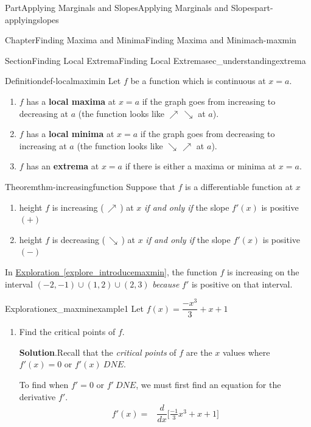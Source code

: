 \documentclass[oneside,10pt,]{tufte-book}
\newcommand{\blocktitlefont}{\relax}
\newcommand{\xreffont}{\relax}
\newcommand{\terminology}[1]{\textbf{#1}}
\numberwithin{equation}{chapter}
\newcommand{\ddx}[1]{ \dfrac{d}{dx} \Big[ #1 \Big]  }
\newcommand{\amp}{&}
\begin{document}
\begin{partptx}{Part}{Applying Marginals and Slopes}{}{Applying Marginals and Slopes}{}{}{part-applyingslopes}
\begin{chapterptx}{Chapter}{Finding Maxima and Minima}{}{Finding Maxima and Minima}{}{}{ch-maxmin}
\begin{sectionptx}{Section}{Finding Local Extrema}{}{Finding Local Extrema}{}{}{sec_understandingextrema}
\begin{definition}{Definition}{}{def-localmaximin}%
Let \(f\) be a function which is continuous at \(x=a\).%
%
\begin{enumerate}
\item{}\(f\) has a \terminology{local maxima} at \(x=a\) if the graph goes from increasing to decreasing at \(a\) (the function looks like \(\nearrow\,\searrow\) at \(a\)).%
\item{}\(f\) has a \terminology{local minima} at \(x=a\) if the graph goes from decreasing to increasing at \(a\) (the function looks like \(\searrow\,\nearrow\) at \(a\)).%
\item{}\(f\) has an \terminology{extrema} at \(x=a\) if there is either a maxima or minima at \(x=a\).%
\end{enumerate}
\end{definition}
\begin{theorem}{Theorem}{}{}{thm-increasingfunction}%
Suppose that \(f\) is a differentiable function at \(x\)%
%
\begin{enumerate}
\item{}height \(f\) is increasing (\(\,\nearrow\,\)) at \(x\) \emph{if and only if} the slope \(f'(x)\) is positive \((+)\)%
\item{}height \(f\) is decreasing (\(\,\searrow\,\)) at \(x\) \emph{if and only if} the slope \(f'(x)\) is positive \((-)\)%
\end{enumerate}
\end{theorem}
In \hyperref[explore_introducemaxmin]{Exploration~{\xreffont\ref{explore_introducemaxmin}}}, the function \(f\) is increasing  on the interval \((-2,-1) \cup (1,2)\cup (2,3)\) \emph{because} \(f'\) is positive on that interval.%
\begin{exploration}{Exploration}{}{ex_maxminexample1}%
Let \(f(x) = \dfrac{-x^3}{3} + x + 1\)%
\begin{enumerate}[font=\bfseries,label=(\alph*),ref=\alph*]%
\item{}Find the critical points of \(f\).%
\par\smallskip%
\noindent\textbf{\blocktitlefont Solution}.\hypertarget{ex_maxminexample1-2-2}{}\quad{}Recall that the \emph{critical points} of \(f\) are the \(x\) values where  \(f'(x) =0\) or \(f'(x) \ DNE\).%
\par
To find when \(f'=0\) or \(f'\ DNE\), we must first find an equation for the derivative \(f'\).%
\begin{align*}
f'(x) = \amp \ddx{ \frac{-1}{3} x^3 + x + 1  } \\

\end{align*}
\end{enumerate}
\end{exploration}
\end{sectionptx}
\end{chapterptx}
\end{partptx}
\end{document}
